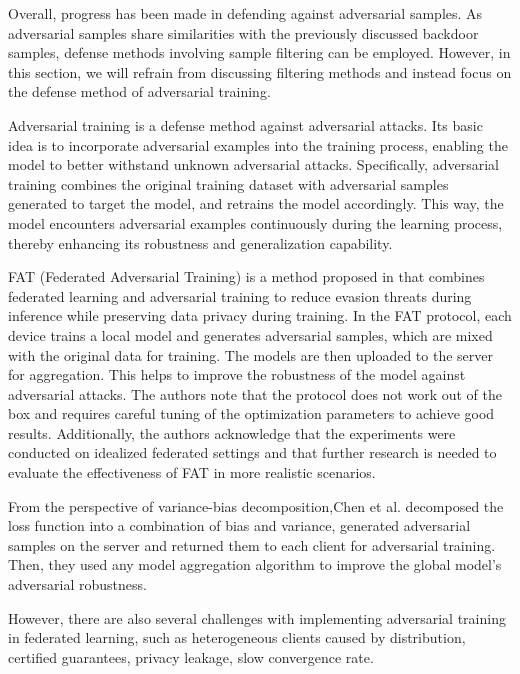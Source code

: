 \documentclass[conference]{IEEEtran}
\begin{document}
Overall, progress has been made in defending against adversarial samples.
As adversarial samples share similarities with the previously discussed backdoor
samples, defense methods involving sample filtering can be employed.
However, in this section, we will refrain from discussing filtering methods
and instead focus on the defense method of adversarial training.

Adversarial training is a defense method against adversarial attacks.
Its basic idea is to incorporate adversarial examples into the training process,
enabling the model to better withstand unknown adversarial attacks.
Specifically, adversarial training combines the original training dataset
with adversarial samples generated to target the model, and retrains the
model accordingly. This way, the model encounters adversarial examples
continuously during the learning process, thereby enhancing its robustness
and generalization capability.

FAT (Federated Adversarial Training) is a method proposed in \cite{b31} that
combines federated learning and adversarial training to reduce evasion
threats during inference while preserving data privacy during training.
In the FAT protocol, each device trains a local model and generates adversarial
samples, which are mixed with the original data for training.
The models are then uploaded to the server for aggregation.
This helps to improve the robustness of the model against adversarial attacks.
The authors note that the protocol does not work out of the box and requires careful
tuning of the optimization parameters to achieve good results. Additionally, the authors
acknowledge that the experiments were conducted on idealized federated settings and that
further research is needed to evaluate the effectiveness of FAT in more realistic scenarios.

From the perspective of variance-bias decomposition,Chen et al.\cite{b108} decomposed the loss function into a combination of bias and variance, generated adversarial samples on the server and returned them to each client for adversarial training. Then, they used any model aggregation algorithm to improve the global model's adversarial robustness.

However, there are also several challenges with implementing adversarial training in federated learning,
such as heterogeneous clients caused by distribution, certified guarantees, privacy leakage, slow convergence rate.
\end{document}
